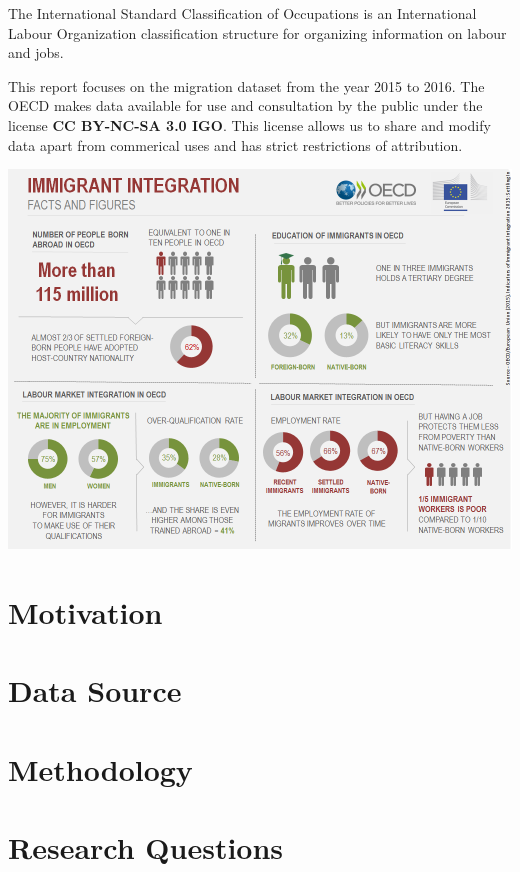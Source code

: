 \documentclass[11pt,a4paper,]{article}
\let\origfigure\figure
\let\endorigfigure\endfigure
\renewenvironment{figure}[1][2] {
    \expandafter\origfigure\expandafter[H]
} {
    \endorigfigure
}%
\begin{document}
The International Standard Classification of Occupations is an International Labour Organization classification structure for organizing information on labour and jobs.

This report focuses on the migration dataset from the year 2015 to 2016. The OECD makes data available for use and consultation by the public under the license \textbf{CC BY-NC-SA 3.0 IGO}. This license allows us to share and modify data apart from commerical uses and has strict restrictions of attribution.

\begin{figure}
\centering
\includegraphics{data/image.png}
\caption{Migration Facts and Figures}
\end{figure}

\section*{Motivation}

\section*{Data Source}

\section*{Methodology}

\section*{Research Questions}
\end{document}

